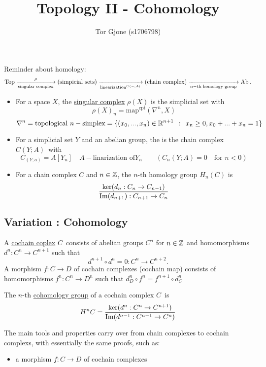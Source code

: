 \documentclass[a4paper,11pt,english]{article}
\title{\textbf{Topology II - Cohomology}}
\author{Tor Gjone (s1706798)}
\begin{document}
\mmaketitle





\def \map {\text{map}}
\def \mapcts {\map^{\text{cpt}}}

Reminder about homology:
\[ \operatorname{Top} \xrightarrow[\text{singular complex}]{\rho} (\text{simpicial sets}) 
\xrightarrow[\text{linearization}^{C(-,A)}]{} (\text{chain complex}) 
\xrightarrow[n-\text{th homology group}]{}  \operatorname{Ab}. \]

\begin{itemize}
\item For a space $X$, the \underline{singular complex} $\rho(X)$ is the
simplicial set with 
\[ \rho(X)_n = \mapcts(\nabla^n, X) \]
\[ \nabla^n = \text{topological } n-\text{simplex} = \{ (x_0, ..., x_n) \in
\mathbb{R}^{n+1} \:\::\:\: x_n \ge 0, x_0 + ... + x_n = 1 \} \]
\item For a simplicial set $Y$ and an abelian group, the 
is the chain complex $C(Y; A)$ with 
\[ C_(Y;a) = A[Y_n] \quad A-\text{linarization of} Y_n \qquad ( C_n(Y;A) = 0
\quad\text{for } n<0) \]
\item For a chain complex $C$ and $n \in \mathbb{Z}$, the $n$-th homology group
$H_n(C)$ is 
\[ \frac{\ker(d_n : C_n \to C_{n-1})}{\operatorname{Im}(d_{n+1}) : C_{n+1} \to C_n}  \]
\end{itemize}


\subsection{Variation : Cohomology}


\begin{defn}
A \underline{cochain coplex} $C$ consists of abelian groups $C^n$ for $n\in\mathbb{Z}$
and homomorphisms $d^n : C^n \to C^{n+1}$ such that 
\[ d^{n+1} \circ d^n = 0 : C^n \to C^{n+2}.  \]
A morphism $f : C \to D$ of cochain complexes (cochain map) consists of
homomorphisms $f^n: C^n \to D^n$ such that $d_D^n \circ f^n = f^{n+1} \circ
d_C^n$ 


The $n$-th \underline{cohomology group} of a cochain complex $C$ is
\[ H^nC = \frac{\ker(d^n : C^n \to C^{n+1})}{\operatorname{Im}(d^{n-1} : C^{n-1} \to C^n)} \]

The main tools and properties carry over from chain complexes to cochain
complexs, with essentially the same proofs, such as:

\begin{itemize}
\item a morphism $f: C \to D$ of cochain complexes 
\end{itemize}

\end{defn}
\end{document}
